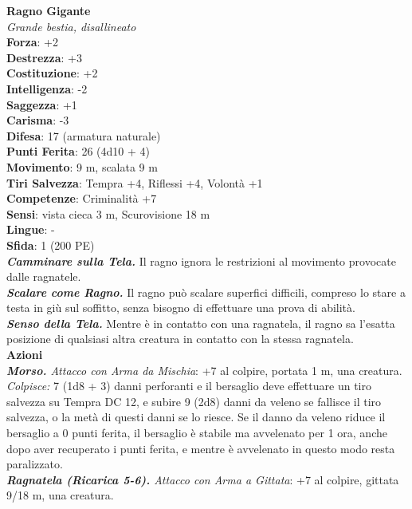 \begin{multicols}{2}
\medskip\textbf{Ragno Gigante}\\
\emph{Grande bestia, disallineato}\\
\textbf{Forza}: +2\\
\textbf{Destrezza}: +3\\
\textbf{Costituzione}: +2\\
\textbf{Intelligenza}: -2\\
\textbf{Saggezza}: +1\\
\textbf{Carisma}: -3\\
\textbf{Difesa}: 17 (armatura naturale)\\
\textbf{Punti Ferita}: 26 (4d10 + 4)\\
\textbf{Movimento}: 9 m, scalata 9 m\\
\textbf{Tiri Salvezza}:  Tempra +4, Riflessi +4, Volontà +1 \\
\textbf{Competenze}: Criminalità +7\\
\textbf{Sensi}: vista cieca 3 m, Scurovisione 18 m\\
\textbf{Lingue}: -\\
\textbf{Sfida}: 1 (200 PE)\smallskip\\
\emph{\textbf{Camminare sulla Tela.}} Il ragno ignora le restrizioni al movimento provocate dalle ragnatele.\\
\emph{\textbf{Scalare come Ragno.}} Il ragno può scalare superfici difficili, compreso lo stare a testa in giù sul soffitto, senza bisogno di effettuare una prova di abilità.\\
\emph{\textbf{Senso della Tela.}} Mentre è in contatto con una ragnatela, il ragno sa l'esatta posizione di qualsiasi altra creatura in contatto con la stessa ragnatela.\\
\smallskip\textbf{Azioni}\\
\emph{\textbf{Morso.} Attacco con Arma da Mischia}: +7 al colpire, portata 1 m, una creatura.\\
\emph{Colpisce:} 7 (1d8 + 3) danni perforanti e il bersaglio deve effettuare un tiro salvezza su Tempra DC  12, e subire 9 (2d8) danni da veleno se fallisce il tiro salvezza, o la metà di questi danni se lo riesce. Se il danno da veleno riduce il bersaglio a 0 punti ferita, il bersaglio è stabile ma avvelenato per 1 ora, anche dopo aver recuperato i punti ferita, e mentre è avvelenato in questo modo resta paralizzato.\\

\emph{\textbf{Ragnatela (Ricarica 5-6).} Attacco con Arma a Gittata}: +7 al colpire, gittata 9/18 m, una creatura.\\


\end{multicols}
